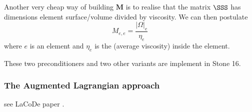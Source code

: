 Another very cheap way of building ${\bm M}$ is to realise that the matrix $\SSS$ has dimensions element surface/volume 
divided by viscosity. We can then postulate 
\[
M_{e,e} = \frac{|\Omega|_e}{\eta_e} 
\]
where $e$ is an element and $\eta_e$ is the (average viscosity) inside the element.

These two preconditioners and two other variants are implement in Stone 16.














\subsubsection{The Augmented Lagrangian approach}

see LaCoDe paper \cite{demh19}.

